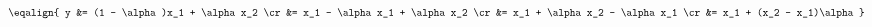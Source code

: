\hsize 0pt
\vsize 0pt
\nopagenumbers
\overfullrule 0pt
\noindent
$$
\eqalign{
y &= (1 - \alpha)x_1 + \alpha x_2 \cr
  &= x_1 - \alpha x_1 + \alpha x_2 \cr
  &= x_1 + \alpha x_2 - \alpha x_1 \cr
  &= x_1 + (x_2 - x_1)\alpha
}
$$
\bye